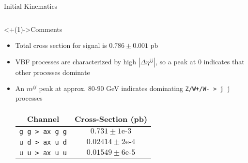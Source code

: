 \documentclass[]{beamer}
\begin{document}
\begin{frame}{Initial Kinematics}
    \begin{columns}
        \begin{column}{0.5\linewidth}
            \begin{block}<+(1)->{Comments}
                \begin{itemize}
                    \item Total cross section for signal is $0.786 \pm 0.001$ pb
                    \item VBF processes are characterized by high $|\Delta \eta^{jj}|$, so a peak at $0$ indicates that other processes dominate
                    \item An $m^{jj}$ peak at approx. $80$-$90$ GeV indicates dominating \texttt{Z/W+/W- > j j} processes
                    
                    \smallskip
                    
                    \begin{tabular}{|c|c|}
                        \hline
                        Channel & Cross-Section (pb) \\
                        \hline
                        \hline
                        \texttt{g g > ax g g} & $0.731 \pm 1\text{e-}3$\\
                        \texttt{u d > ax u d} & $0.02414 \pm 2\text{e-}4$\\
                        \texttt{u u > ax u u} & $0.01549 \pm 6\text{e-}5$\\
                        \hline
                    \end{tabular}
                    
                    \smallskip
                    

\end{itemize}
\end{block}
\end{column}
\end{columns}
\end{frame}
\end{document}
